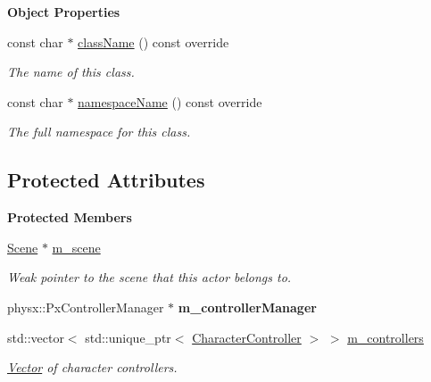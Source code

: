 \begin{Indent}\textbf{ Object Properties}\par
\begin{DoxyCompactItemize}
\item 
const char $\ast$ \mbox{\hyperlink{classrev_1_1_c_c_t_manager_aef919c90f9877381d2f2c1ef24839741}{class\+Name}} () const override
\begin{DoxyCompactList}\small\item\em The name of this class. \end{DoxyCompactList}\item 
const char $\ast$ \mbox{\hyperlink{classrev_1_1_c_c_t_manager_af40188f0c27823159bf272a0d867892b}{namespace\+Name}} () const override
\begin{DoxyCompactList}\small\item\em The full namespace for this class. \end{DoxyCompactList}\end{DoxyCompactItemize}
\end{Indent}
\subsection*{Protected Attributes}
\begin{Indent}\textbf{ Protected Members}\par
\begin{DoxyCompactItemize}
\item 
\mbox{\label{classrev_1_1_c_c_t_manager_a181a4f07169c51ed4cd281f0c08e574f}} 
\mbox{\hyperlink{classrev_1_1_scene}{Scene}} $\ast$ \mbox{\hyperlink{classrev_1_1_c_c_t_manager_a181a4f07169c51ed4cd281f0c08e574f}{m\+\_\+scene}}
\begin{DoxyCompactList}\small\item\em Weak pointer to the scene that this actor belongs to. \end{DoxyCompactList}\item 
\mbox{\label{classrev_1_1_c_c_t_manager_a88520aaa37c2d1871d99559e5d7a881c}} 
physx\+::\+Px\+Controller\+Manager $\ast$ {\bfseries m\+\_\+controller\+Manager}
\item 
\mbox{\label{classrev_1_1_c_c_t_manager_a3070ffeed0a93f47bcf4afeb5435e16d}} 
std\+::vector$<$ std\+::unique\+\_\+ptr$<$ \mbox{\hyperlink{classrev_1_1_character_controller}{Character\+Controller}} $>$ $>$ \mbox{\hyperlink{classrev_1_1_c_c_t_manager_a3070ffeed0a93f47bcf4afeb5435e16d}{m\+\_\+controllers}}
\begin{DoxyCompactList}\small\item\em \mbox{\hyperlink{classrev_1_1_vector}{Vector}} of character controllers. \end{DoxyCompactList}\end{DoxyCompactItemize}
\end{Indent}
